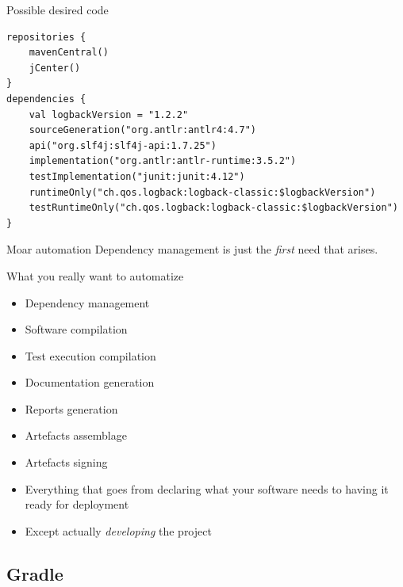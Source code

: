 \documentclass[presentation]{beamer}
\begin{document}
\begin{frame}[fragile]{Possible desired code}
  \begin{block}{}
    \begin{verbatim}
repositories {
    mavenCentral()
    jCenter()
}
dependencies {
    val logbackVersion = "1.2.2"
    sourceGeneration("org.antlr:antlr4:4.7")
    api("org.slf4j:slf4j-api:1.7.25")
    implementation("org.antlr:antlr-runtime:3.5.2")
    testImplementation("junit:junit:4.12")
    runtimeOnly("ch.qos.logback:logback-classic:$logbackVersion")
    testRuntimeOnly("ch.qos.logback:logback-classic:$logbackVersion")
}
    \end{verbatim}
  \end{block}
\end{frame}


\begin{frame}[fragile]{Moar automation}
	Dependency management is just the \textit{first} need that arises.
	
	\begin{block}{What you really want to automatize}
		\begin{itemize}
			\item Dependency management
			\item Software compilation
			\item Test execution compilation
			\item Documentation generation
			\item Reports generation
			\item Artefacts assemblage
			\item Artefacts signing
		\end{itemize}
	\end{block}
	\begin{itemize}
		\item Everything that goes from declaring what your software needs to having it ready for deployment
		\item Except actually \textit{developing} the project
	\end{itemize}
\end{frame}

\subsection{Gradle}
\end{document}
